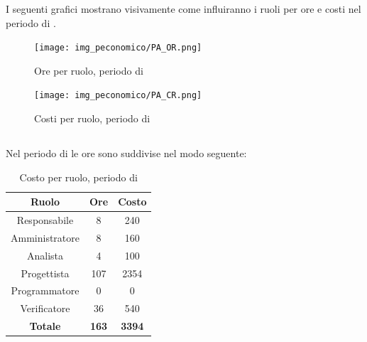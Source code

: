 I seguenti grafici mostrano visivamente come influiranno i ruoli per ore e costi nel periodo di \PA.
\begin{figure}[H]
	\centering
	\texttt{[image: img\_peconomico/PA\_OR.png]}
	\caption{Ore per ruolo, periodo di \PA}
\end{figure}
\begin{figure}[H]
	\centering
	\texttt{[image: img\_peconomico/PA\_CR.png]}
	\caption{Costi per ruolo, periodo di \PA}
\end{figure}

\subsection{\PD}
Nel periodo di \PD{} le ore sono suddivise nel modo seguente:
\begin{table}[H]
	\centering
	\begin{tabular}{|c|c|c|}
		\hline
		\textbf{Ruolo} &
		\textbf{Ore} &
		\textbf{Costo} \\
		\hline
		Responsabile & 8 & 240 \\
		\hline
		Amministratore & 8 & 160 \\
		\hline
		Analista & 4 & 100\\
		\hline
		Progettista & 107 & 2354 \\
		\hline
		Programmatore & 0 & 0 \\
		\hline
		Verificatore & 36 & 540 \\
		\hline
		\textbf{Totale} & \textbf{163} & \textbf{3394} \\
		\hline
	\end{tabular}
	\caption{Costo per ruolo, periodo di \PD}
\end{table}

